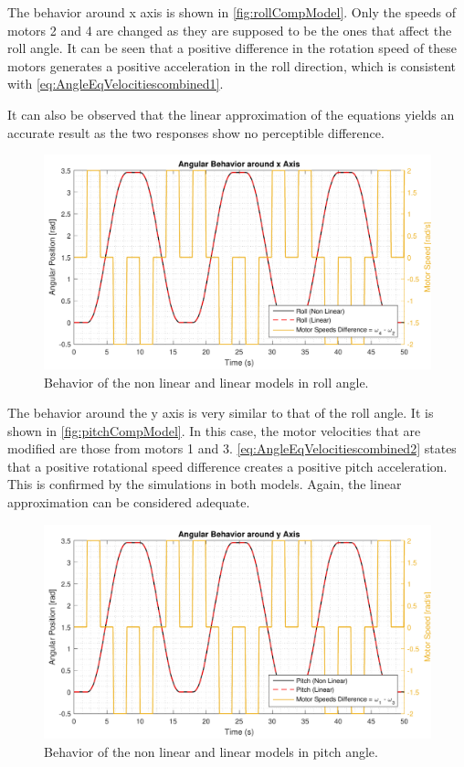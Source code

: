 The behavior around x axis is shown in \autoref{fig:rollCompModel}. Only the speeds of motors 2 and 4 are changed as they are supposed to be the ones that affect the roll angle. It can be seen that a positive difference in the rotation speed of these motors generates a positive acceleration in the roll direction, which is consistent with \autoref{eq:AngleEqVelocitiescombined1}.

It can also be observed that the linear approximation of the equations yields an accurate result as the two responses show no perceptible difference. 
%
\begin{figure}[H]
	\centering
	\includegraphics[scale=0.65]{figures/rollCompModel}
	\caption{Behavior of the non linear and linear models in roll angle.}
	\label{fig:rollCompModel}
\end{figure}
%
The behavior around the y axis is very similar to that of the roll angle. It is shown in \autoref{fig:pitchCompModel}. In this case, the motor velocities that are modified are those from motors 1 and 3. 
%
\autoref{eq:AngleEqVelocitiescombined2} states that a positive rotational speed difference creates a positive pitch acceleration. This is confirmed by the simulations in both models. Again, the linear approximation can be considered adequate.
\begin{figure}[H]
	\centering
	\includegraphics[scale=0.65]{figures/pitchCompModel}
	\caption{Behavior of the non linear and linear models in pitch angle.}
	\label{fig:pitchCompModel}
\end{figure}
